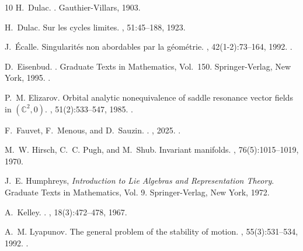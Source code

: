 \documentclass[10pt,twoside,reqno]{amsart}
\theoremstyle{remark}
\theoremstyle{remark}
\begin{document}
\begin{thebibliography}{10}
	H.~Dulac.
	.
	\newblock Gauthier-Villars, 1903.
	
	H.~Dulac.
	\newblock Sur les cycles limites.
	, 51:45--188, 1923.
	
	J.~\'Ecalle.
	\newblock Singularit\'es non abordables par la g\'eom\'etrie.
	, 42(1-2):73--164, 1992.
	\newblock \href {https://doi.org/10.5802/aif.1287}
	{}.
	
	D.~Eisenbud.
	.
	\newblock Graduate Texts in Mathematics, Vol.~150.
	\newblock Springer-Verlag, New York, 1995.
	\newblock \href{https://doi.org/10.1007/978-1-4612-5350-1}
	{}.
	
	P.~M. Elizarov.
	\newblock Orbital analytic nonequivalence of saddle resonance vector fields in
	$(\mathbb{C}^2,0)$.
	, 51(2):533--547, 1985.
	\newblock \href {https://doi.org/10.1070/SM1985v051n02ABEH002873}
	{}.
	
	F.~Fauvet, F.~Menous, and D.~Sauzin.
	.
	, 2025.
	\newblock \href {https://arxiv.org/abs/2507.13216} {}.
	
	M.~W. Hirsch, C.~C. Pugh, and M.~Shub.
	\newblock Invariant manifolds.
	,
	76(5):1015--1019, 1970.
	
	J.~E. Humphreys,
	\newblock \emph{Introduction to Lie Algebras and Representation Theory}.
	\newblock Graduate Texts in Mathematics, Vol. 9. Springer-Verlag, New York, 1972.
	
	A.~Kelley.
	.
	,
	18(3):472--478, 1967.
	
	A.~M. Lyapunov.
	\newblock The general problem of the stability of motion.
	, 55(3):531--534, 1992.
	\newblock \href {https://doi.org/10.1080/00207179208934253}
	{}.
	

\end{thebibliography}
\end{document}
